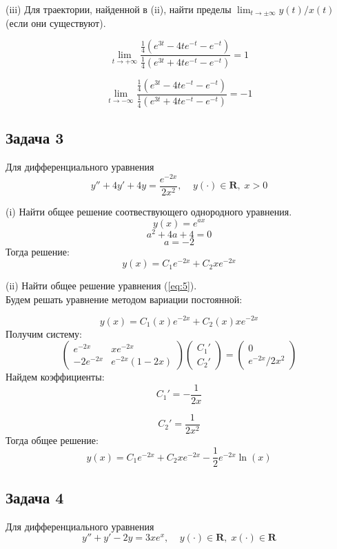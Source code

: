\documentclass[a4paper, 12pt]{article}
\begin{document}
(iii) Для траектории, найденной в (ii), найти пределы $\lim_{t\rightarrow\pm\infty}y(t)/x(t)$ (если они существуют).


\[\lim_{t\rightarrow+\infty}\frac{\frac 1 4\left(e^{3t} -4te^{-t}-e^{-t}\right)}{ \frac 1 4\left(e^{3t} +4te^{-t}-e^{-t}\right)}=1 \]

\[\lim_{t\rightarrow-\infty}\frac{\frac 1 4\left(e^{3t} -4te^{-t}-e^{-t}\right)}{ \frac 1 4\left(e^{3t} +4te^{-t}-e^{-t}\right)}=-1\]


	\subsection* {Задача 3}
Для дифференциального уравнения 
\begin{equation}
y''+4y'+4y=\frac {e^{-2x}}{2x^2}, \;\;\;\; y(\cdot)\in \textbf{R},\; x>0
\label{eq:5}
\end{equation}

(i) Найти общее решение соотвествующего однородного уравнения.\\
\[y(x) = e^{ax}\]
\[a^2+4a+4=0\]
\[a = -2\]
Тогда решение:
\[y(x)=C_1e^{-2x}+C_2xe^{-2x}\]

(ii) Найти общее решение уравнения (\ref{eq:5}).\\
Будем решать уравнение методом вариации постоянной:

\[y(x)= C_1(x)e^{-2x}+C_2(x)xe^{-2x}\]
Получим систему:
\[ \left(
\begin{array}{cc}
e^{-2x} & xe^{-2x} \\
-2e^{-2x} & e^{-2x}(1-2x)
\end{array}
\right) \left(
\begin{array}{c}
C_1' \\
C_2'
\end{array} 
\right)= \left(
\begin{array}{c}
0 \\
e^{-2x}/2x^2
\end{array}
\right) \]
Найдем коэффициенты:
\[C_1' = -\frac 1 {2x}\]

\[C_2' = \frac 1  {2x^2}\]
Тогда общее решение:
\[y(x) = C_1e^{-2x}+C_2xe^{-2x}-\frac 1 2 e^{-2x}\ln(x)\]




	\subsection* {Задача 4}

Для дифференциального уравнения
\begin{equation}
y''+y'-2y=3xe^x, \;\;\;\; y(\cdot)\in \textbf{R}, \; x(\cdot)\in \textbf{R}
\label{eq:6}
\end{equation}
\end{document}
